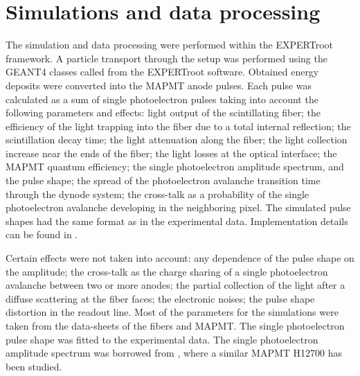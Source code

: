 \documentclass{webofc}
\newcommand{\er}{\textmd{EXPERTroot}}
\newcommand{\red}[1]{\textcolor{red}{#1}}
\begin{document}
\section{Simulations and data processing}

The simulation and data processing were performed within the \er\, framework.
A particle transport through the setup was performed using the GEANT4 \cite{geant4} classes called from the EXPERTroot software. Obtained energy deposits were converted into the MAPMT anode pulses.
Each pulse was calculated as a sum of single photoelectron pulses taking into account the following parameters and effects: light output of the scintillating fiber; the efficiency of the light trapping into the fiber due to a total internal reflection; the scintillation decay time; the light attenuation along the fiber; the light collection increase near the ends of the fiber; the light losses at the optical interface; the MAPMT quantum efficiency; the single photoelectron amplitude spectrum, and the pulse shape; the spread of the photoelectron avalanche transition time through the dynode system; the cross-talk as a probability of the single photoelectron avalanche developing in the neighboring pixel.
The simulated pulse shapes had the same format as in the experimental data. Implementation details can be found in \cite{neuradSim}. 

Certain effects were not taken into account: any dependence of the pulse shape on the amplitude; the cross-talk as the charge sharing of a single photoelectron avalanche between two or more anodes; the partial collection of the light after a diffuse scattering at the fiber faces; the electronic noises; the pulse shape distortion in the readout line. Most of the parameters for the simulations were taken from the data-sheets of the fibers and MAPMT. The single photoelectron pulse shape was fitted to the experimental data. The single photoelectron amplitude spectrum was borrowed from \cite{adam2018}, where a similar MAPMT H12700 has been studied.

\end{document}
